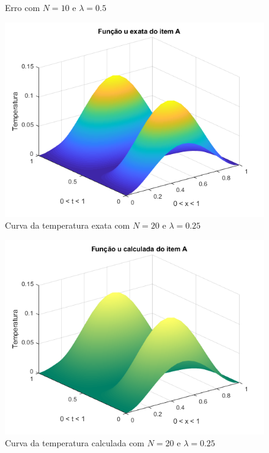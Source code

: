 \documentclass[12pt]{article}
\begin{document}
\begin{spacing}{1.5}
\begin{figure}
    \caption{Erro com $N=10$ e $\lambda=0.5$}
    \label{fig:A_n10lambda0-5_erro}
\end{figure}


\begin{figure}
    \centering
    \includegraphics[width=0.8\linewidth]{Primeira_Tarefa/ItemA/n20_lambda0-25_exata.png}
    \caption{Curva da temperatura exata com $N=20$ e $\lambda=0.25$}
    \label{fig:A_n20lambda0-25_exata}
\end{figure}
\begin{figure}
    \centering
    \includegraphics[width=0.8\linewidth]{Primeira_Tarefa/ItemA/n20_lambda0-25_calc.png}
    \caption{Curva da temperatura calculada com $N=20$ e $\lambda=0.25$}
    \label{fig:A_n20lambda0-25_calc}
\end{figure}
\begin{figure}
    \centering

\end{figure}
\end{spacing}
\end{document}
